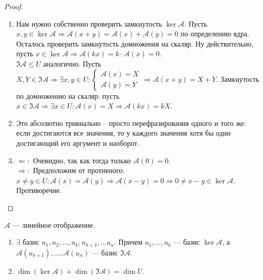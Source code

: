 \begin{proof}
    \begin{enumerate}
        \item Нам нужно собственно проверить замкнутость $\ker \mathcal{A}$. Пусть $x, y \in \ker \mathcal{A} \Rightarrow \mathcal{A}(x + y) = \mathcal{A}(x) + \mathcal{A}(y) = 0$ по определению ядра. Осталось проверить замкнутость домножения на скаляр. Ну действительно, пусть $x \in \ker \mathcal{A} \Rightarrow \mathcal{A}(kx) = k \cdot \mathcal{A}(x) = 0$.\\
        $\Im \mathcal{A} \le U$ аналогично. Пусть $X, Y \in \Im \mathcal{A} \Rightarrow \exists x, y \in U : \begin{cases}\mathcal{A}(x) = X\\
        \mathcal{A}(y) = Y\end{cases} \Rightarrow \mathcal{A}(x + y) = X + Y$. Замкнутость по домножению на скаляр: пусть $x \in \Im \mathcal{A} \Rightarrow \exists x \in U : \mathcal{A}(x) = X \Rightarrow \mathcal{A}(kx) = kX$.
        \item Это абсолютно тривиально -- просто перефразирования одного и того же: если достигаются все значения, то у каждого значения хотя бы один достигающий его аргумент и наоборот.
        \item $\Leftarrow\!:$ Очевидно, так как тогда только $\mathcal{A}(0) = 0$.\\
        $\Rightarrow\!:$ Предположим от противного: $x \neq y \in U : \mathcal{A}(x) = \mathcal{A}(y) \Rightarrow \mathcal{A}(x - y) = 0 \Rightarrow 0 \neq x - y \in \ker \mathcal{A}$. Противоречие.
    \end{enumerate}
\end{proof}
\begin{theorem}
    $\mathcal{A}$ --- линейное отображение.
    \begin{enumerate}
        \item $\exists$ базис  $u_1, u_2, \ldots, u_k, u_{k+1}, \ldots u_n$. Причем $u_1, \ldots, u_k$ --- базис $\ker \mathcal{A}$, а  $\mathcal{A}(u_{k+1}), \ldots, \mathcal{A}(u_n)$ --- базис $\Im \mathcal{A}$.
        \item  $\dim (\ker \mathcal{A}) + \dim (\Im \mathcal{A}) = \dim U$.
    \end{enumerate}
\end{theorem}
